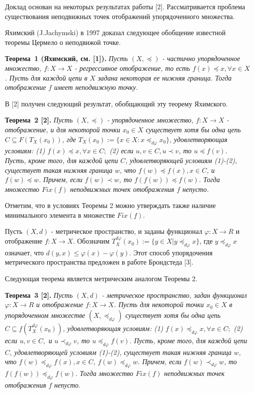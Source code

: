 \vzmscaption

Доклад основан на некоторых результатах работы [2]. Рассматривается проблема существования неподвижных точек отображений упорядоченного  множества.

Яхимский (J.Jachymski) в 1997 доказал следующее обобщение известной теоремы Цермело о неподвижой точке.

\textbf{Теорема~1 (Яхимский, см. [1]).}  {\it Пусть  $(X,\preceq)$  - частично упорядоченное множество,  $f: X\to X$ - регрессивное отображение, то есть $f(x)\preceq x, \forall x\in X$. Пусть для каждой цепи в $X$  задана некоторая ее нижняя граница. Тогда отображение $f$ имеет неподвижную точку.}

В [2] получен следующий результат, обобщающий эту теорему Яхимского.

\textbf{Теорема~2 [2].} {\it Пусть $(X,\preceq)$ - упорядоченное множество, $f: X\to X$ - отображение, и для некоторой точки $x_{0}\in X$ существует хотя бы одна цепь $C\subseteq F(T_{X}(x_{0}))$, где $T_{X}(x_{0}):=\{x\in X : x\preceq_{d\varphi}x_{0}\}$, удовлетворяющая условиям: (1) $ f(x)\preceq x,\forall x\in C;$ (2) если $u,v\in C, u\prec v$, то $u\preceq f(v)$. Пусть, кроме того, для каждой цепи $C$, удовлетворяющей условиям (1)-(2), существует такая нижняя граница $w$, что $f(w)\preceq f(x), x\in C$, и $f(w)\preceq w$. Причем, если $f(w)\prec w$, то $f(f(w))\preceq f(w)$. Тогда множество $Fix(f)$ неподвижных точек отображения $f$ непусто.}

Отметим, что в условиях Теоремы 2 можно утверждать также наличие минимального элемента в множестве $Fix(f)$.


Пусть $(X,d)$ - метрическое пространство, и заданы функционал $\varphi: X\to R$ и отображение $f: X\to X$. Обозначим $T_{X}^{d\varphi}(x_{0}):=\{y\in X | y\preceq_{d \varphi}x\}$, где $y\preceq_{d \varphi}x$ означает, что $d(y,x)\le \varphi(x)-\varphi(y)$. Этот способ упорядочения метрического пространства предложен в работе Брондстеда [3].

Следующая теорема является метрическим аналогом Теоремы 2.

\textbf{Теорема~3 [2].} {\it  Пусть $(X,d)$ - метрическое пространство, задан  функционал $\varphi :X\to R$ и  отображение $f: X\to X$. Пусть для некоторой точки $x_{0}\in X$ в упорядоченном множестве $(X, \preceq_{d \varphi})$ существует хотя бы одна цепь $C\subseteq f(T_{X}^{d \varphi}(x_{0}))$, удовлетворяющая условиям: (1) $f(x)\preceq_{d \varphi} x, \forall x\in C;$ (2) если $u,v\in C,$ и $u\prec_{d \varphi} v$, то $u\preceq_{d \varphi} f(v)$. Пусть, кроме того, для каждой цепи $C$, удовлетворяющей условиям (1)-(2), существует такая нижняя граница $w$, что $f(w)\preceq_{d \varphi} f(x), x\in C$, $f(w)\preceq_{d \varphi} w$. Причем, если $f(w)\prec_{d \varphi} w$, то $f(f(w))\preceq_{d \varphi} f(w)$. Тогда множество $Fix(f)$ неподвижных точек отображения $f$ непусто.}

